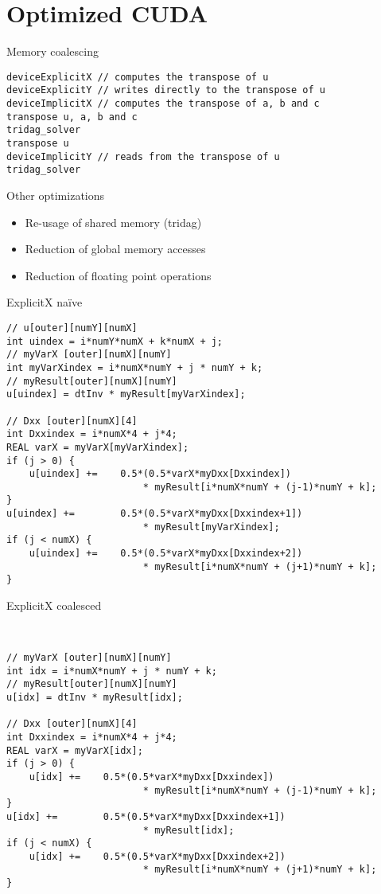 \documentclass[14pt,t,english]{beamer}
\begin{document}
\section{Optimized CUDA}
%
\begin{frame}[c,fragile]{Memory coalescing}
\begingroup
	\fontsize{10pt}{12pt}\selectfont
\begin{verbatim}
deviceExplicitX // computes the transpose of u
deviceExplicitY // writes directly to the transpose of u
deviceImplicitX // computes the transpose of a, b and c
transpose u, a, b and c
tridag_solver
transpose u
deviceImplicitY // reads from the transpose of u
tridag_solver
\end{verbatim}
\endgroup
\end{frame}
%
\begin{frame}[c]{Other optimizations}
\begin{itemize}
	\vfill
	\item Re-usage of shared memory (tridag)
	\vfill
	\item Reduction of global memory accesses
	\vfill
	\item Reduction of floating point operations
	\vfill
\end{itemize}
\end{frame}
%
\begin{frame}[fragile]{ExplicitX na\"ive}
\begin{lstlisting}
// u[outer][numY][numX]
int uindex = i*numY*numX + k*numX + j;
// myVarX [outer][numX][numY]
int myVarXindex = i*numX*numY + j * numY + k;
// myResult[outer][numX][numY]
u[uindex] = dtInv * myResult[myVarXindex];

// Dxx [outer][numX][4]
int Dxxindex = i*numX*4 + j*4;
REAL varX = myVarX[myVarXindex];
if (j > 0) {
    u[uindex] +=    0.5*(0.5*varX*myDxx[Dxxindex])
                        * myResult[i*numX*numY + (j-1)*numY + k];
}
u[uindex] +=        0.5*(0.5*varX*myDxx[Dxxindex+1])
                        * myResult[myVarXindex];
if (j < numX) {
    u[uindex] +=    0.5*(0.5*varX*myDxx[Dxxindex+2])
                        * myResult[i*numX*numY + (j+1)*numY + k];
}
\end{lstlisting}
\end{frame}
%
\begin{frame}[fragile]{ExplicitX coalesced}

\begin{lstlisting}


// myVarX [outer][numX][numY]
int idx = i*numX*numY + j * numY + k;
// myResult[outer][numX][numY]
u[idx] = dtInv * myResult[idx];

// Dxx [outer][numX][4]
int Dxxindex = i*numX*4 + j*4;
REAL varX = myVarX[idx];
if (j > 0) {
    u[idx] +=    0.5*(0.5*varX*myDxx[Dxxindex])
                        * myResult[i*numX*numY + (j-1)*numY + k];
}
u[idx] +=        0.5*(0.5*varX*myDxx[Dxxindex+1])
                        * myResult[idx];
if (j < numX) {
    u[idx] +=    0.5*(0.5*varX*myDxx[Dxxindex+2])
                        * myResult[i*numX*numY + (j+1)*numY + k];
}
\end{lstlisting}
\end{frame}
\end{document}
